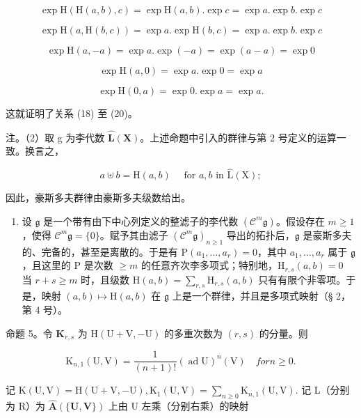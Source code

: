 \[
\exp \mathrm{H} (\mathrm{H} (a, b), c) = \exp \mathrm{H} (a, b). \exp c = \exp a. \exp b. \exp c
\]

\[
\exp \mathrm{H} (a, \mathrm{H} (b, c)) = \exp a. \exp \mathrm{H} (b, c) = \exp a. \exp b. \exp c
\]

\[
\exp \mathrm{H} (a, - a) = \exp a. \exp (- a) = \exp (a - a) = \exp 0
\]

\[
\exp \mathrm{H} (a, 0) = \exp a. \exp 0 = \exp a
\]

\[
\exp \mathrm{H} (0, a) = \exp 0. \exp a = \exp a.
\]

这就证明了关系 (18) 至 (20)。

注。（2）取 g 为李代数 \(\hat{\mathbf{L}}(\mathbf{X})\)。上述命题中引入的群律与第 2 号定义的运算一致。换言之，

\[
a \uplus b = \mathrm{H} (a, b) \quad \text { for   } a, b \text {   in   } \hat {\mathrm{L}} (\mathrm{X});\tag{21}
\]

因此，豪斯多夫群律由豪斯多夫级数给出。

\begin{enumerate}
\def\labelenumi{(\arabic{enumi})}
\setcounter{enumi}{2}
\tightlist
\item
  设 \(\mathfrak{g}\) 是一个带有由下中心列定义的整滤子的李代数 \((\mathcal{C}^m\mathfrak{g})\)。假设存在 \(m \geqslant 1\)，使得 \(\mathcal{C}^m\mathfrak{g} = \{0\}\)。赋予其由滤子 \((\mathcal{C}^m\mathfrak{g})_{n \geqslant 1}\) 导出的拓扑后，\(\mathfrak{g}\) 是豪斯多夫的、完备的，甚至是离散的。于是有 \(\mathrm{P}(a_1, \ldots, a_r) = 0\)，其中 \(a_1, \ldots, a_r\) 属于 \(\mathfrak{g}\)，且这里的 \(\mathrm{P}\) 是次数 \(\geqslant m\) 的任意齐次李多项式；特别地，\(\mathrm{H}_{r,s}(a, b) = 0\) 当 \(r + s \geqslant m\) 时，且级数 \(\mathrm{H}(a, b) = \sum_{r,s} \mathrm{H}_{r,s}(a, b)\) 只有有限个非零项。于是，映射 \((a, b) \mapsto \mathrm{H}(a, b)\) 在 \(\mathfrak{g}\) 上是一个群律，并且是多项式映射（§ 2，第 4 号）。
\end{enumerate}

命题 5。令 \(\mathbf{K}_{r,s}\) 为 \(\mathrm{H}(\mathrm{U} + \mathrm{V}, -\mathrm{U})\) 的多重次数为 \((r,s)\) 的分量。则

\[
\mathrm{K} _ {n, 1} (\mathrm{U}, \mathrm{V}) = \frac {1}{(n + 1) !} (\operatorname{ad} \mathrm{U}) ^ {n} (\mathrm{V}) \quad for n \geqslant 0.
\]

记 \(\mathrm{K}(\mathrm{U},\mathrm{V}) = \mathrm{H}(\mathrm{U} + \mathrm{V}, - \mathrm{U}),\mathrm{K}_1(\mathrm{U},\mathrm{V}) = \sum_{n\geqslant 0}\mathrm{K}_{n,1}(\mathrm{U},\mathrm{V}).\) 记 L（分别为 R）为 \(\hat{\mathbf{A}} (\{\mathbf{U},\mathbf{V}\})\) 上由 U 左乘（分别右乘）的映射

